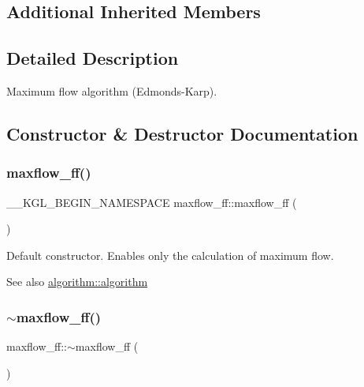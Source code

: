 \subsection*{Additional Inherited Members}


\subsection{Detailed Description}
Maximum flow algorithm (Edmonds-\/\+Karp). 

\subsection{Constructor \& Destructor Documentation}
\mbox{\label{classmaxflow__ff_a47280ecd91e227e529455249ee390ca3}} 
\subsubsection{\texorpdfstring{maxflow\+\_\+ff()}{maxflow\_ff()}}
{\footnotesize\ttfamily \+\_\+\+\_\+\+K\+G\+L\+\_\+\+B\+E\+G\+I\+N\+\_\+\+N\+A\+M\+E\+S\+P\+A\+CE maxflow\+\_\+ff\+::maxflow\+\_\+ff (\begin{DoxyParamCaption}{ }\end{DoxyParamCaption})}

Default constructor. Enables only the calculation of maximum flow.

\begin{DoxySeeAlso}{See also}
\mbox{\hyperlink{classalgorithm_ab79e1ddec2f2afdf4b36b10724db8b15}{algorithm\+::algorithm}} 
\end{DoxySeeAlso}
\mbox{\label{classmaxflow__ff_ae1c3c5ba0b8c55cdba429ee906bce7d9}} 
\subsubsection{\texorpdfstring{$\sim$maxflow\+\_\+ff()}{~maxflow\_ff()}}
{\footnotesize\ttfamily maxflow\+\_\+ff\+::$\sim$maxflow\+\_\+ff (\begin{DoxyParamCaption}{ }\end{DoxyParamCaption})\hspace{0.3cm}{\ttfamily [virtual]}}


